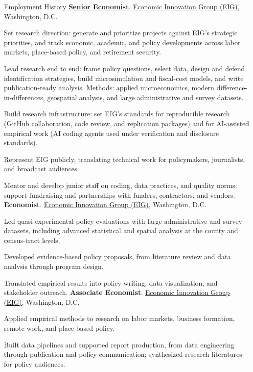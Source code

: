 \begin{rubric}{Employment History}
%
    \textbf{\href{https://eig.org/about-us/executive-team-staff/ben-glasner/}{Senior Economist}}. \href{https://eig.org/}{Economic Innovation Group (EIG)}, Washington, D.C.
    \par Set research direction: generate and prioritize projects against EIG's strategic priorities, and track economic, academic, and policy developments across labor markets, place-based policy, and retirement security.
    \par Lead research end to end: frame policy questions, select data, design and defend identification strategies, build microsimulation and fiscal-cost models, and write publication-ready analysis. Methods: applied microeconomics, modern difference-in-differences, geospatial analysis, and large administrative and survey datasets.
    \par Build research infrastructure: set EIG's standards for reproducible research (GitHub collaboration, code review, and replication packages) and for AI-assisted empirical work (AI coding agents used under verification and disclosure standards).
    \par Represent EIG publicly, translating technical work for policymakers, journalists, and broadcast audiences.
    \par Mentor and develop junior staff on coding, data practices, and quality norms; support fundraising and partnerships with funders, contractors, and vendors.
%
    \textbf{Economist}. \href{https://eig.org/}{Economic Innovation Group (EIG)}, Washington, D.C.
    \par Led quasi-experimental policy evaluations with large administrative and survey datasets, including advanced statistical and spatial analysis at the county and census-tract levels.
    \par Developed evidence-based policy proposals, from literature review and data analysis through program design.
    \par Translated empirical results into policy writing, data visualization, and stakeholder outreach.
%
    \textbf{Associate Economist}. \href{https://eig.org/}{Economic Innovation Group (EIG)}, Washington, D.C.
    \par Applied empirical methods to research on labor markets, business formation, remote work, and place-based policy.
    \par Built data pipelines and supported report production, from data engineering through publication and policy communication; synthesized research literatures for policy audiences.

\end{rubric}
